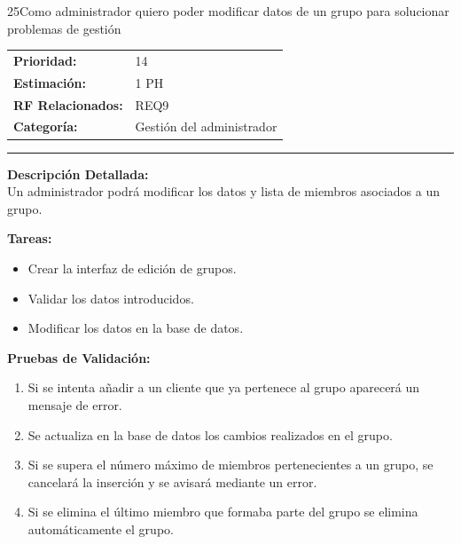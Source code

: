 \begin{hu_card}{25}{Como administrador quiero poder modificar datos de un grupo para solucionar problemas de gestión}
    \begin{tabularx}{\linewidth}{l X}
        \textbf{Prioridad:}   & 14\\
        \textbf{Estimación:}  & 1 PH \\
        \textbf{RF Relacionados:} & REQ9 \\
        \textbf{Categoría:} & Gestión del administrador \\
    \end{tabularx}

    \vspace{2mm}
    \hrule
    \vspace{2mm}

    \textbf{Descripción Detallada:} \\
    Un administrador podrá modificar los datos y lista de miembros asociados a un grupo.

    \vspace{2mm}
    \textbf{Tareas:}
    \begin{itemize}[noitemsep, topsep=0pt]
        \item Crear la interfaz de edición de grupos.
        \item Validar los datos introducidos.
        \item Modificar los datos en la base de datos.
    \end{itemize}

    \vspace{2mm}
    \textbf{Pruebas de Validación:}
    \begin{enumerate}[noitemsep, topsep=0pt]
        \item Si se intenta añadir a un cliente que ya pertenece al grupo aparecerá un mensaje de error.
        \item Se actualiza en la base de datos los cambios realizados en el grupo.
        \item Si se supera el número máximo de miembros pertenecientes a un grupo, se cancelará la inserción y se avisará mediante un error.
        \item Si se elimina el último miembro que formaba parte del grupo se elimina automáticamente el grupo.
    \end{enumerate}
\end{hu_card}

